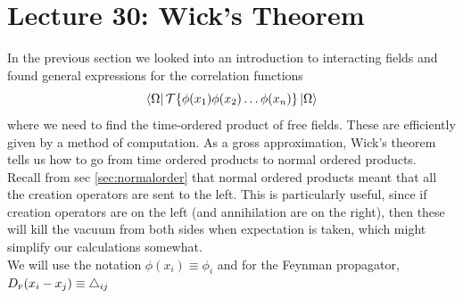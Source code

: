 \section*{Lecture 30: Wick's Theorem}
In the previous section we looked into an introduction to interacting fields and found general expressions for the correlation functions
$$\bra{\Omega} \mathcal T \{\phi(x_1)\phi(x_2)\ldots \phi(x_n)\}\ket{\Omega}$$
  where we need to find the time-ordered product of free fields. These are efficiently given by a method of computation. As a gross approximation, Wick's theorem tells us how to go from time ordered products to normal ordered products.\\[0.2cm]
Recall from sec \ref{sec:normalorder} that normal ordered products meant that all the creation operators are sent to the left. This is particularly useful, since if creation operators are on the left (and annihilation are on the right), then these will kill the vacuum from both sides when expectation is taken, which might simplify our calculations somewhat.  \\[0.2cm]
We will use the notation $\phi(x_i) \equiv \phi_i$ and for the Feynman propagator, $D_{\text{\tiny F}}(x_i - x_j) \equiv \triangle_{ij}$
